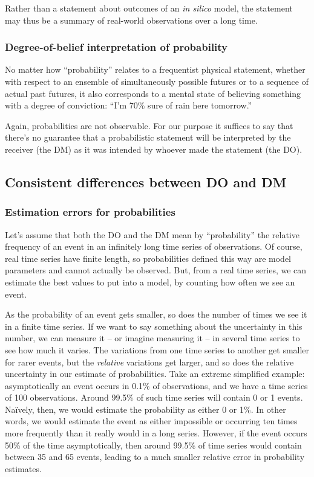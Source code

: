 \documentclass[a4paper, 12pt]{article}
\newcommand{\seclabel}[1]{\label{sec:#1}}
\begin{document}
Rather than a statement about outcomes of an \textit{in silico} model, the statement may thus be a summary of real-world observations over a long time.

\subsubsection*{Degree-of-belief interpretation of probability}
No matter how ``probability'' relates to a frequentist physical statement, whether with respect to an ensemble of simultaneously possible futures or to a sequence of actual past futures, it also corresponds to a mental state of believing something with a degree of conviction: 
``I'm 70\% sure of rain here tomorrow.''

Again, probabilities are not observable.
For our purpose it suffices to say that there's no guarantee that a probabilistic statement will be interpreted by the receiver (the DM) as it was intended by whoever made the statement (the DO).

\subsection{Consistent differences between DO and DM \seclabel{condition2}}

\subsubsection*{Estimation errors for probabilities}
Let's assume that both the DO and the DM mean by ``probability'' the relative frequency of an event in an infinitely long time series of observations. Of course, real time series have finite length, so probabilities defined this way are model parameters and cannot actually be observed. But, from a real time series, we can estimate the best values to put into a model, by counting how often we see an event.

As the probability of an event gets smaller, so does the number of times we see it in a finite time series. If we want to say something about the uncertainty in this number, we can measure it -- or imagine measuring it -- in several time series to see how much it varies. The variations from one time series to another get smaller for rarer events, but the \textit{relative} variations get larger, and so does the relative uncertainty in our estimate of probabilities. Take an extreme simplified example: asymptotically an event occurs in 0.1\% of observations, and we have a time series of 100 observations.
Around 99.5\% of such time series will contain 0 or 1 events. Na\"{i}vely, then, we would estimate the probability as either 0 or 1\%. In other words, we would estimate the event as either impossible or occurring ten times more frequently than it really would in a long series. However, if the event occurs 50\% of the time asymptotically, then around 99.5\% of time series would contain between 35 and 65 events, leading to a much smaller relative error in probability estimates.
\end{document}
